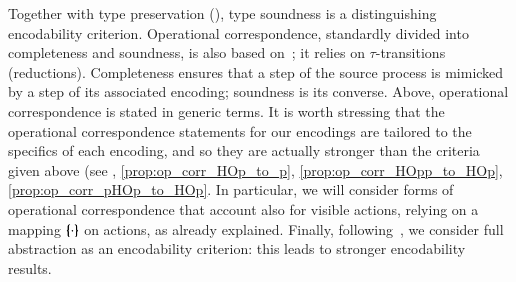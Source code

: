 \documentclass[preprint,11pt]{elsarticle}
\newtheorem{proposition}{Proposition}[section]
\begin{document}
{%
Together with type preservation (), type soundness is a distinguishing encodability criterion.
Operational correspondence, standardly divided into completeness and soundness, is also based
on~\cite{DBLP:journals/iandc/Gorla10};
it relies on 
$\tau$-transitions (reductions).
Completeness ensures that a step of the source process is mimicked
by a step of its associated encoding; soundness is its converse.
{Above, operational correspondence is stated in generic terms.}
It is worth stressing that 
the operational correspondence statements 
for our encodings 
 are tailored to the specifics of each encoding, and so they
 are actually stronger than the criteria given above
 {(see , \ref{prop:op_corr_HOp_to_p}, \ref{prop:op_corr_HOpp_to_HOp}, \ref{prop:op_corr_pHOp_to_HOp}.}
 In particular, we will consider forms of operational correspondence that account also for visible actions, relying on 
 a mapping $\{\!\!\{\cdot\}\!\!\}$ on actions, as already explained.
Finally, following~\cite{SangiorgiD:expmpa,DBLP:conf/lics/PalamidessiSVV06,Yoshida96},
we consider full abstraction as an encodability criterion: this leads to 
stronger encodability results. 

%
%


}
\end{document}
